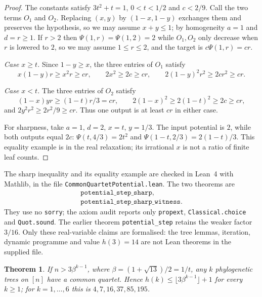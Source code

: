 \documentclass[11pt]{amsart}
\newtheorem{theorem}{Theorem}[section]
\theoremstyle{remark}
\begin{document}
\begin{proof}
The constants satisfy $3t^2+t=1$, $0<t<1/2$ and $c<2/9$. Call the two terms $O_1$ and $O_2$. Replacing $(x,y)$ by $(1-x,1-y)$ exchanges them and preserves the hypothesis, so we may assume $x+y\le1$; by homogeneity $a=1$ and $d=r\ge1$. If $r>2$ then $\Psi(1,r)=\Psi(1,2)=2$ while $O_1,O_2$ only decrease when $r$ is lowered to $2$, so we may assume $1\le r\le2$, and the target is $c\Psi(1,r)=cr$.

\emph{Case $x\ge t$.} Since $1-y\ge x$, the three entries of $O_1$ satisfy
\[
x(1-y)r\ge x^2r\ge cr,\qquad 2x^2\ge2c\ge cr,\qquad
2(1-y)^2r^2\ge2cr^2\ge cr.
\]

\emph{Case $x<t$.} The three entries of $O_2$ satisfy
\[
(1-x)yr\ge(1-t)r/3=cr,\qquad
2(1-x)^2\ge2(1-t)^2\ge2c\ge cr,
\]
and $2y^2r^2\ge2r^2/9\ge cr$. Thus one output is at least $cr$ in either case.

For sharpness, take $a=1$, $d=2$, $x=t$, $y=1/3$. The input potential is $2$, while both outputs equal $2c$: $\Psi(t,4/3)=2t^2$ and $\Psi(1-t,2/3)=2(1-t)/3$. This equality example is in the real relaxation; its irrational $x$ is not a ratio of finite leaf counts.
\end{proof}

The sharp inequality and its equality example are checked in Lean~4 with Mathlib, in the file \texttt{CommonQuartetPotential.lean}. The two theorems are
\[
\begin{gathered}
\texttt{potential\_step\_sharp},\\
\texttt{potential\_step\_sharp\_witness}.
\end{gathered}
\]
They use no \texttt{sorry}; the axiom audit reports only \texttt{propext}, \texttt{Classical.choice} and \texttt{Quot.sound}. The earlier theorem \texttt{potential\_step} retains the weaker factor $3/16$. Only these real-variable claims are formalised: the tree lemmas, iteration, dynamic programme and value $h(3)=14$ are not Lean theorems in the supplied file.

\begin{theorem}\label{thm:weighted}
If $n>3\beta^{k-1}$, where $\beta=(1+\sqrt{13})/2=1/t$, any $k$ phylogenetic trees on $[n]$ have a common quartet. Hence $h(k)\le\lfloor3\beta^{k-1}\rfloor+1$ for every $k\ge1$; for $k=1,\dots,6$ this is $4,7,16,37,85,195$.
\end{theorem}
\end{document}
